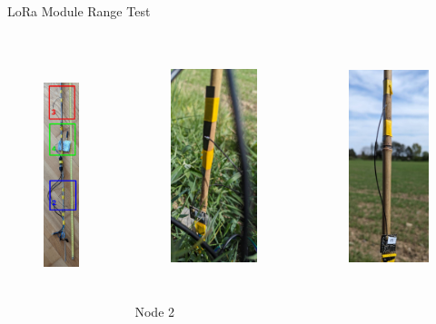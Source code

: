 \documentclass{beamer}
\begin{document}
\begin{frame}{LoRa Module Range Test}
\begin{columns}[T]
\begin{column}{.3\textwidth}
    \centering
    \begin{figure}
        \includegraphics[height=7.5cm]{img/lora-pole.jpg}
    \end{figure}
\end{column}
\hfil
\begin{column}{.3\textwidth}
    \centering
    \begin{figure}
        \includegraphics[height=7cm]{../thesis/img/range-pole-bottom.jpg}
    \end{figure}
    \vspace{-1em}
    Node 2
\end{column}
\hfil
\begin{column}{.3\textwidth}
    \centering
    \begin{figure}
        \includegraphics[height=7cm]{../thesis/img/range-pole-top.jpg}

\end{figure}
\end{column}
\end{columns}
\end{frame}
\end{document}

